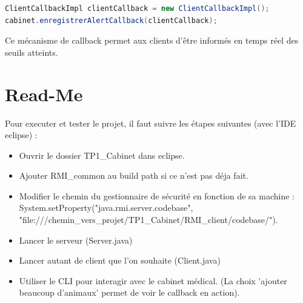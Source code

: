 \documentclass{article} %
\begin{document}
\begin{lstlisting}[language=Java]
ClientCallbackImpl clientCallback = new ClientCallbackImpl();
cabinet.enregistrerAlertCallback(clientCallback);
\end{lstlisting}

Ce mécanisme de callback permet aux clients d'être informés en temps réel des seuils atteints.

\newpage
\section{Read-Me}
Pour executer et tester le projet, il faut suivre les étapes suivantes (avec l'IDE eclipse) :

\begin{itemize}
    \item Ouvrir le dossier TP1\_Cabinet dans eclipse.
    \item Ajouter RMI\_common au build path si ce n'est pas déja fait.
    \item Modifier le chemin du gestionnaire de sécurité en fonction de sa machine : 
    System.setProperty("java.rmi.server.codebase", 
    \newline"file:///chemin\_vers\_projet/TP1\_Cabinet/RMI\_client/codebase/").
    \item Lancer le serveur (Server.java)
    \item Lancer autant de client que l'on souhaite (Client.java)
    \item Utiliser le CLI pour interagir avec le cabinet médical. (La choix 'ajouter beaucoup d'animaux' permet de voir le callback en action).
\end{itemize}
\end{document}
